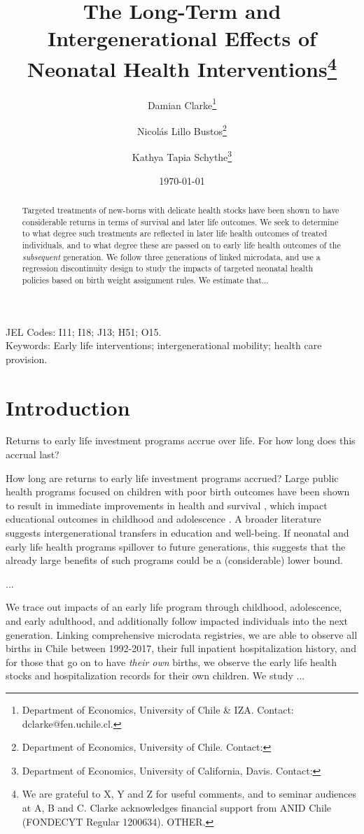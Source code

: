 \documentclass[11pt]{article}
\title{The Long-Term and Intergenerational Effects of Neonatal Health Interventions\thanks{We are grateful to X, Y and Z for useful comments, and to seminar audiences at A, B and C. Clarke acknowledges financial support from ANID Chile (FONDECYT Regular 1200634).  OTHER.  }}
\author{Damian Clarke\thanks{Department of Economics, University of Chile \& IZA.  Contact: dclarke@fen.uchile.cl.}
  \and Nicol\'as Lillo Bustos\thanks{Department of Economics, University of Chile.  Contact:}
  \and Kathya Tapia Schythe\thanks{Department of Economics, University of California, Davis.  Contact:}
}
\date{\today}
\begin{document}
\begin{spacing}{1.5}
  \maketitle

  \begin{abstract}
    Targeted treatments of new-borns with delicate health stocks have been shown to have considerable returns in terms of survival and later life outcomes.  We seek to determine to what degree such treatments are reflected in later life health outcomes of treated individuals, and to what degree these are passed on to early life health outcomes of the \emph{subsequent} generation.  We follow three generations of linked microdata, and use a regression discontinuity design to study the impacts of targeted neonatal health policies based on birth weight assignment rules.  We estimate that...
  \end{abstract}

  \noindent JEL Codes: I11; I18; J13; H51; O15. \\
  Keywords: Early life interventions; intergenerational mobility; health care provision. \\

  \clearpage

  \section{Introduction}
  Returns to early life investment programs accrue over life.  For how long does this accrual last?  

  

  How long are returns to early life investment programs accrued?  Large public health programs focused on children with poor birth outcomes have been shown to result in immediate improvements in health and survival \citep{Almondetal2010}, which impact educational outcomes in childhood and adolescence \citep{Bharadwajetal2013}.  A broader literature suggests intergenerational transfers in education and well-being.  If neonatal and early life health programs spillover to future generations, this suggests that the already large benefits of such programs could be a (considerable) lower bound.


  ...
  
  We trace out impacts of an early life program through childhood, adolescence, and early adulthood, and additionally follow impacted individuals into the next generation.  Linking comprehensive microdata registries, we are able to observe all births in Chile between 1992-2017, their full inpatient hospitalization history, and for those that go on to have \emph{their own} births, we observe the early life health stocks and hospitalization records for their own children.  We study ...


\end{spacing}
\end{document}
